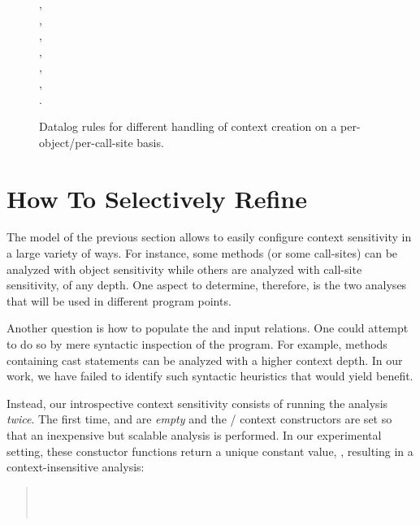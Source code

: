 \begin{figure}[h!tp]
\begin{datalog}
    , \\
    , \\
    ,\\
    , \\
    ,\\
    , \\
    .
\end{datalog}
\caption[]{Datalog rules for different handling of context creation on a per-object/per-call-site basis.}
\label{fig:introspect:rules}
\end{figure}


\section{How To Selectively Refine}
\label{sec:introspect:heuristics}

The model of the previous section allows to easily configure context sensitivity in a large variety of ways. For instance, some methods (or some call-sites) can be analyzed with object sensitivity while others are analyzed with call-site sensitivity, of any depth. One aspect to determine, therefore, is the two analyses that will be used in different program points.

Another question is how to populate the  and  input relations. One could attempt to do so by mere syntactic inspection of the program. For example, methods containing cast statements can be analyzed with a higher context depth. In our work, we have failed to identify such syntactic heuristics that would yield benefit.

Instead, our introspective context sensitivity consists of running the analysis \emph{twice}. The first time,  and  are \emph{empty} and the / context constructors are set so that an inexpensive but scalable analysis is performed. In our experimental setting, these constuctor functions return a unique constant value, \args{$\star$}, resulting in a context-insensitive analysis:

\begin{quote}
\\
 \\
\end{quote}

